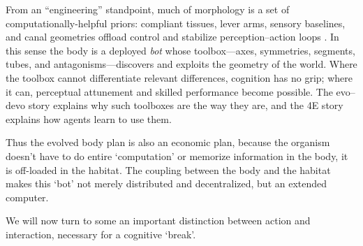 From an “engineering” standpoint, much of morphology is a set of computationally-helpful priors: compliant tissues, lever arms, sensory baselines, and canal geometries offload control and stabilize perception–action loops \citep{pfeifer2007body}. In this sense the body is a deployed \emph{bot} whose toolbox—axes, symmetries, segments, tubes, and antagonisms—discovers and exploits the geometry of the world. Where the toolbox cannot differentiate relevant differences, cognition has no grip; where it can, perceptual attunement and skilled performance become possible. The evo–devo story explains why such toolboxes are the way they are, and the 4E story explains how agents learn to use them.

Thus the evolved body plan is also an economic plan, because the organism doesn't have to do entire `computation' or memorize information in the body, it is off-loaded in the habitat.  The coupling between the body and the habitat makes this `bot' not merely distributed and decentralized, but an extended computer. 

We will now turn to some an important distinction between action and interaction, necessary for a cognitive `break'. 
